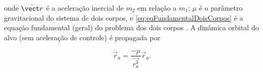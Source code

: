  







onde $\ddot{\vect r}$ é a aceleração inercial de $m_2$ em relação a $m_1$; $\mu$ é o parâmetro gravitacional do sistema de dois corpos, e \eqref{eq:eqFundamentalDoisCorpos} é a equação fundamental (geral) do problema dos dois corpos \cite{fehse2003,wie2008space}.
A dinâmica orbital do alvo (sem aceleração de controle) é propagada por

\begin{equation}
\label{eq:movimentoalvo}
\ddot{\vec r}_a = \frac{-\mu}{\vec {r^3_a}}\vec {r}_a.
\end{equation}

